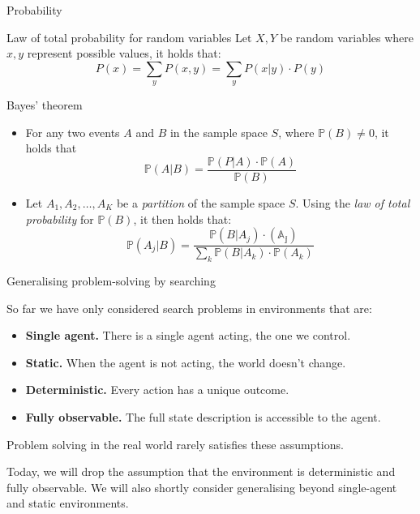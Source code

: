 \documentclass[aspectratio=169,hyperref={pdfpagelabels=false}]{beamer}
\begin{document}
\begin{frame}[allowframebreaks]{Probability}
    \begin{block}{Law of total probability for random variables}
    Let \(X,Y\) be random variables where \(x,y\) represent possible values, it holds that:
    \[
        P(x) = \sum_y P(x,y) = \sum_y P(x|y)\cdot P(y)
    \]
    \end{block}
    \framebreak
    
    
    \begin{block}{Bayes' theorem}
    \begin{itemize}
        \item For any two events \(A\) and \(B\) in the sample space \(S\), where \(\mathds{P}(B) \neq 0\), it holds that
        \[\mathds{P}(A|B) = \frac{\mathds{P}(P|A) \cdot \mathds{P}(A)}{\mathds{P}(B)}\]
        \item Let \(A_1, A_2, \dots , A_K\) be a \textit{partition} of the sample space \(S\). Using the \textit{law of total probability} for \(\mathds{P}(B)\), it then holds that:
        \[
            \mathds{P}(A_j | B) = \frac{\mathds{P}(B|A_j) \cdot \mathds{(A_j)}}{\sum_k \mathds{P}(B|A_k) \cdot \mathds{P}(A_k)}
        \]
    \end{itemize}
    \end{block}
\end{frame}

\begin{frame}{Generalising problem-solving by searching}

So far we have only considered search problems in environments that are:
\begin{itemize}
    \item \textbf{Single agent.} There is a single agent acting, the one we control.
    \item \textbf{Static.} When the agent is not acting, the world doesn't change.
    \item \textbf{Deterministic.} Every action has a unique outcome.
    \item \textbf{Fully observable.} The full state description is accessible to the agent.
\end{itemize}
Problem solving in the real world rarely satisfies these assumptions.

Today, we will drop the assumption that the environment is deterministic and fully observable. We will also shortly consider generalising beyond single-agent and static environments.

\end{frame}
\end{document}
